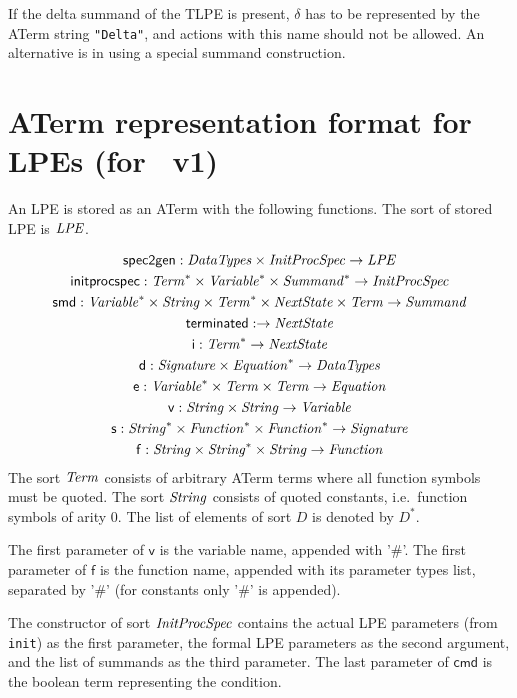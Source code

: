 \documentclass[twoside,fleqn,a4paper,dvips]{article}
\newcommand{\afunc}[3]{\mathsf{#1}:#2\rightarrow#3}
\begin{document}
If the delta summand of the TLPE is present, $\delta$ has to be
represented by the ATerm string \texttt{"Delta"}, and actions with
this name should not be allowed.  An alternative is in using a special
summand construction.

\newpage
\section{ATerm representation format for LPEs (for \mcrl\ v1)}
An LPE is stored as an ATerm with the following functions. The sort
of stored LPE is $\mathit{LPE}$.

\begin{gather*}
\afunc{spec2gen}{\nm{DataTypes}\x\nm{InitProcSpec}}{\nm{LPE}}\\
\afunc{initprocspec}{\nm{Term}^*\x\nm{Variable}^*\x\nm{Summand}^*}{\nm{InitProcSpec}}\\
\afunc{smd}{\nm{Variable}^*\x\nm{String}\x\nm{Term}^*\x\nm{NextState}\x\nm{Term}}{\nm{Summand}}\\
\afunc{terminated}{}{\nm{NextState}}\\
\afunc{i}{\nm{Term}^*}{\nm{NextState}}\\
\afunc{d}{\nm{Signature}\x\nm{Equation}^*}{\nm{DataTypes}}\\
\afunc{e}{\nm{Variable}^*\x\nm{Term}\x\nm{Term}}{\nm{Equation}}\\
\afunc{v}{\nm{String}\x\nm{String}}{\nm{Variable}}\\
\afunc{s}{\nm{String}^*\x\nm{Function}^*\x\nm{Function}^*}{\nm{Signature}}\\
\afunc{f}{\nm{String}\x\nm{String}^{*}\x\nm{String}}{\nm{Function}}
\end{gather*}
The sort $\mathit{Term}$ consists of arbitrary ATerm terms where all function
symbols must be quoted. The sort $\mathit{String}$ consists of quoted constants,
i.e.\ function symbols of arity 0. The list
of elements of sort $D$ is denoted by $D^{*}$.

The first parameter of $\mathsf{v}$ is the variable name, appended with '\#'.
The first parameter of $\mathsf{f}$ is the function name, appended 
with its parameter types list, separated by '\#' (for constants only '\#' is appended).

The constructor of sort $\mathit{InitProcSpec}$ contains the actual LPE
parameters (from \texttt{init}) as the first parameter, the formal LPE
parameters as the second argument, and the list of summands as the
third parameter. The last parameter of $\mathsf{cmd}$ is the boolean term
representing the condition.
\end{document}
